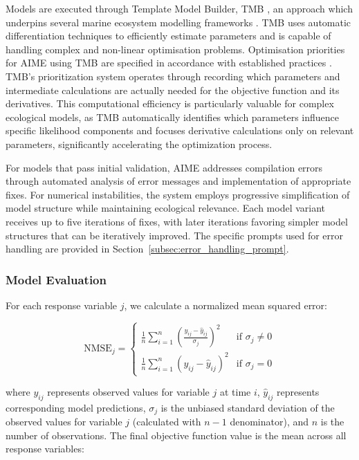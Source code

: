 Models are executed through Template Model Builder, TMB \citep{kristensen2014tmb}, an approach which underpins several marine ecosystem modelling frameworks \citep{chasco2021differential,albertsen2015fast,auger2017spatiotemporal}. TMB uses automatic differentiation techniques to efficiently estimate parameters and is capable of handling complex and non-linear optimisation problems. Optimisation priorities for AIME using TMB are specified in accordance with established practices \citep{Plaganyi_Punt_Hillary_Morello_Thebaud_Hutton_Pillans_Thorson_Fulton_Smith_et_al_2014,Rogers_Plaganyi_2022}. TMB's prioritization system operates through recording which parameters and intermediate calculations are actually needed for the objective function and its derivatives. This computational efficiency is particularly valuable for complex ecological models, as TMB automatically identifies which parameters influence specific likelihood components and focuses derivative calculations only on relevant parameters, significantly accelerating the optimization process.

For models that pass initial validation, AIME addresses compilation errors through automated analysis of error messages and implementation of appropriate fixes. For numerical instabilities, the system employs progressive simplification of model structure while maintaining ecological relevance. Each model variant receives up to five iterations of fixes, with later iterations favoring simpler model structures that can be iteratively improved. The specific prompts used for error handling are provided in Section~\ref{subsec:error_handling_prompt}.

\subsubsection{Model Evaluation}

For each response variable $j$, we calculate a normalized mean squared error:

\begin{equation}
    \text{NMSE}_j = \begin{cases}
        \frac{1}{n} \sum_{i=1}^{n} \left(\frac{y_{ij} - \hat{y}_{ij}}{\sigma_j}\right)^2 & \text{if } \sigma_j \neq 0 \\
        \frac{1}{n} \sum_{i=1}^{n} (y_{ij} - \hat{y}_{ij})^2 & \text{if } \sigma_j = 0
    \end{cases}
\end{equation}

where $y_{ij}$ represents observed values for variable $j$ at time $i$, $\hat{y}_{ij}$ represents corresponding model predictions, $\sigma_j$ is the unbiased standard deviation of the observed values for variable $j$ (calculated with $n-1$ denominator), and $n$ is the number of observations. The final objective function value is the mean across all response variables:

